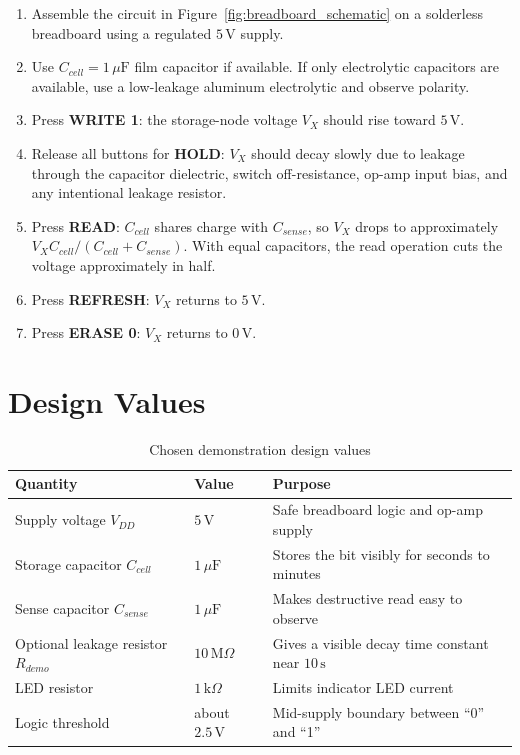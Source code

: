 \documentclass[12pt,a4paper]{report}
\begin{document}
\begin{enumerate}[leftmargin=*]
    \item Assemble the circuit in Figure~\ref{fig:breadboard_schematic} on a solderless breadboard using a regulated $5\,\mathrm{V}$ supply.
    \item Use $C_{cell}=1\,\mu\mathrm{F}$ film capacitor if available. If only electrolytic capacitors are available, use a low-leakage aluminum electrolytic and observe polarity.
    \item Press \textbf{WRITE 1}: the storage-node voltage $V_X$ should rise toward $5\,\mathrm{V}$.
    \item Release all buttons for \textbf{HOLD}: $V_X$ should decay slowly due to leakage through the capacitor dielectric, switch off-resistance, op-amp input bias, and any intentional leakage resistor.
    \item Press \textbf{READ}: $C_{cell}$ shares charge with $C_{sense}$, so $V_X$ drops to approximately $V_X C_{cell}/(C_{cell}+C_{sense})$. With equal capacitors, the read operation cuts the voltage approximately in half.
    \item Press \textbf{REFRESH}: $V_X$ returns to $5\,\mathrm{V}$.
    \item Press \textbf{ERASE 0}: $V_X$ returns to $0\,\mathrm{V}$.
\end{enumerate}

\section{Design Values}

\begin{table}[H]
    \centering
    \caption{Chosen demonstration design values}
    \label{tab:design_values}
    \begin{tabular}{@{}lll@{}}
        \toprule
        \textbf{Quantity} & \textbf{Value} & \textbf{Purpose} \\
        \midrule
        Supply voltage $V_{DD}$ & $5\,\mathrm{V}$ & Safe breadboard logic and op-amp supply \\
        Storage capacitor $C_{cell}$ & $1\,\mu\mathrm{F}$ & Stores the bit visibly for seconds to minutes \\
        Sense capacitor $C_{sense}$ & $1\,\mu\mathrm{F}$ & Makes destructive read easy to observe \\
        Optional leakage resistor $R_{demo}$ & $10\,\mathrm{M}\Omega$ & Gives a visible decay time constant near $10\,\mathrm{s}$ \\
        LED resistor & $1\,\mathrm{k}\Omega$ & Limits indicator LED current \\
        Logic threshold & about $2.5\,\mathrm{V}$ & Mid-supply boundary between ``0'' and ``1'' \\
        \bottomrule
    \end{tabular}
\end{table}
\end{document}
